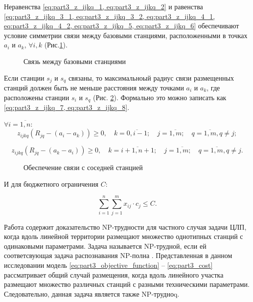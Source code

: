 Неравенства \cref{eq:part3_z_ijkq_1, eq:part3_z_ijkq_2} и равенства \cref{eq:part3_z_ijkq_3_1, eq:part3_z_ijkq_3_2, eq:part3_z_ijkq_4_1, eq:part3_z_ijkq_4_2, eq:part3_z_ijkq_5, eq:part3_z_ijkq_6} обеспечивают условие симметрии связи между базовыми станциями, расположенными в точках $ a_i $ и $ a_k $, $\forall i, k $ (Рис.\cref{fig:part3_station_link}).

\begin{figure}[ht]
  \caption{Связь между базовыми станциями}\label{fig:part3_station_link}
\end{figure}

Если станции $ s_j $ и $ s_q $ связаны, то максимальноый радиус связи размещенных станций должен быть не меньше расстояния между точками $ a_i $ и $ a_k $, где расположены станции $ s_i $ и $ s_q $ (Рис. \cref{fig:part3_station_link_between_points}). Формально это можно записать как \cref{eq:part3_z_ijkq_7, eq:part3_z_ijkq_8}.

 $\forall i= \overline{1,n}$:
\begin{equation}
  \label{eq:part3_z_ijkq_7}
  z_{ijkq}(R_{jq}-(a_i-a_k ))\geq 0, \quad k=\overline{0,i-1}; \quad j=\overline{1,m}; \quad q= \overline{1,m}, q \neq j; 
\end{equation}

\begin{equation}
  \label{eq:part3_z_ijkq_8}
  z_{ijkq} (R_{jq}-(a_k-a_i )) \geq 0, \quad k=\overline{i+1,n+1}; \quad j=\overline{1,m}; \quad q= \overline{1,m}, q \neq j.
\end{equation}

\begin{figure}[ht]
  \caption{Обеспечение связи с соседней станцией}\label{fig:part3_station_link_between_points}
\end{figure}

И для бюджетного ограничения $C$:

\begin{equation}
  \label{eq:part3_cost}
  \sum\limits_{i=1}^n \sum\limits_{j=1}^m x_{ij} \cdot c_j \leq C.
\end{equation}

Работа \cite{Ivanov2018} содержит доказательство NP-трудности для частного случая задачи ЦЛП, когда вдоль линейной территории размещают множество однотипных станций с одинаковыми параметрами. Задача называется NP-трудной, если ей соответсвующая задача распознавания NP-полна \cite{Pershin2013}.  Представленная в данном исследовании модель \cref{eq:part3_objective_function} -- \cref{eq:part3_cost} рассматривает общий случай размещения, когда вдоль линейного участка размещают множество различных станций с разными техническими параметрами. Следовательно, данная задача является также NP-трудноq.

